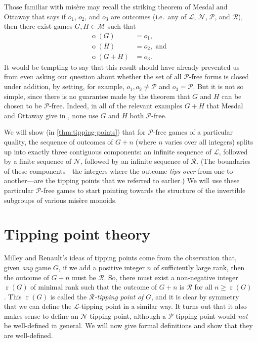\documentclass[11pt]{article}
\theoremstyle{definition}
\DeclareMathOperator{\outcome}{o}
\newcommand{\set}[1]{\mathcal{#1}}
\DeclareMathOperator{\rtp}{r}
\begin{document}
Those familiar with mis\`ere may recall the striking theorem of Mesdal and
Ottaway \cite[Theorem 3 on p.4]{mesdal.ottaway:simplification} that says if
$o_1$, $o_2$, and $o_3$ are outcomes (i.e.\ any of $\mathscr{L}$,
$\mathscr{N}$, $\mathscr{P}$, and $\mathscr{R}$), then there exist games
$G,H\in\set{M}$ such that
\begin{align*}
	\outcome(G)&=o_1,\\
	\outcome(H)&=o_2,\text{ and}\\
	\outcome(G+H)&=o_3.
\end{align*}
It would be tempting to say that this result should have already prevented us
from even asking our question about whether the set of all $\mathscr{P}$-free
forms is closed under addition, by setting, for example,
$o_1,o_2\neq\mathscr{P}$ and $o_3=\mathscr{P}$. But it is not so simple, since
there is no guarantee made by the theorem that $G$ and $H$ can be chosen to be
$\mathscr{P}$-free. Indeed, in all of the relevant examples $G+H$ that Mesdal
and Ottaway give in \cite[Appendix on
pp.~11--12]{mesdal.ottaway:simplification}, none use $G$ and $H$ both
$\mathscr{P}$-free.

We will show (in \cref{thm:tipping-points}) that for $\mathscr{P}$-free games
of a particular quality, the sequence of outcomes of $G+n$ (where $n$ varies
over all integers) splits up into exactly three contiguous components: an
infinite sequence of $\mathscr{L}$, followed by a finite sequence of
$\mathscr{N}$, followed by an infinite sequence of $\mathscr{R}$. (The
boundaries of these components---the integers where the outcome \emph{tips
over} from one to another---are the tipping points that we referred to
earlier.) We will use these particular $\mathscr{P}$-free games to start
pointing towards the structure of the invertible subgroups of various mis\`ere
monoids.

\section{Tipping point theory}
\label{sec:tipping-points}

Milley and Renault's ideas of tipping points come from the observation that,
given \emph{any} game $G$, if we add a positive integer $n$ of sufficiently
large rank, then the outcome of $G+n$ must be $\mathscr{R}$. So, there must
exist a non-negative integer $\rtp(G)$ of minimal rank such that the outcome of
$G+n$ is $\mathscr{R}$ for all $n\geq\rtp(G)$. This $\rtp(G)$ is called the
\emph{$\mathscr{R}$-tipping point of $G$}, and it is clear by symmetry that we
can define the $\mathscr{L}$-tipping point in a similar way. It turns out that
it also makes sense to define an $\mathscr{N}$-tipping point, although a
$\mathscr{P}$-tipping point would \emph{not} be well-defined in general. We
will now give formal definitions and show that they are well-defined.
\end{document}
